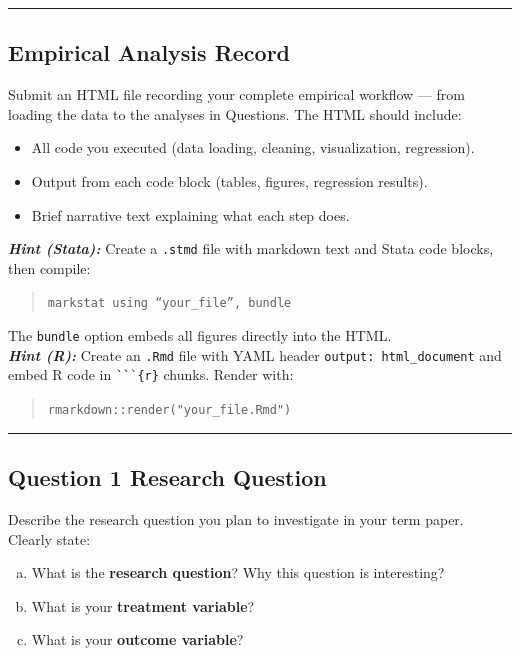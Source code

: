 \documentclass[paper=a4, fontsize=11pt]{scrartcl}
\newcommand{\horrule}[1]{\rule{\linewidth}{#1}}
\begin{document}
\bigskip\horrule{0.4pt}\bigskip


\subsection*{Empirical Analysis Record}

Submit an HTML file recording your complete empirical workflow --- from loading the data to the analyses in Questions. The HTML should include:
\begin{itemize}
  \item All code you executed (data loading, cleaning, visualization, regression).
  \item Output from each code block (tables, figures, regression results).
  \item Brief narrative text explaining what each step does.
\end{itemize}

\medskip
\textit{\textbf{Hint (Stata):}} Create a \texttt{.stmd} file with markdown text and Stata code blocks, then compile:
\begin{quote}\texttt{markstat using ``your\_file'', bundle}\end{quote}
The \texttt{bundle} option embeds all figures directly into the HTML. \\

\textit{\textbf{Hint (R):}} Create an \texttt{.Rmd} file with YAML header \texttt{output: html\_document} and embed R code in \texttt{\`{}\`{}\`{}\{r\}} chunks. Render with:
\begin{quote}\texttt{rmarkdown::render("your\_file.Rmd")}\end{quote}

\bigskip\horrule{0.4pt}\bigskip


\subsection*{Question 1 \quad Research Question}

Describe the research question you plan to investigate in your term paper. Clearly state:
\begin{enumerate}[(a)]
  \item What is the \textbf{research question}? Why this question is interesting?
  \item What is your \textbf{treatment variable}? 
  \item What is your \textbf{outcome variable}? 
\end{enumerate}
\end{document}
